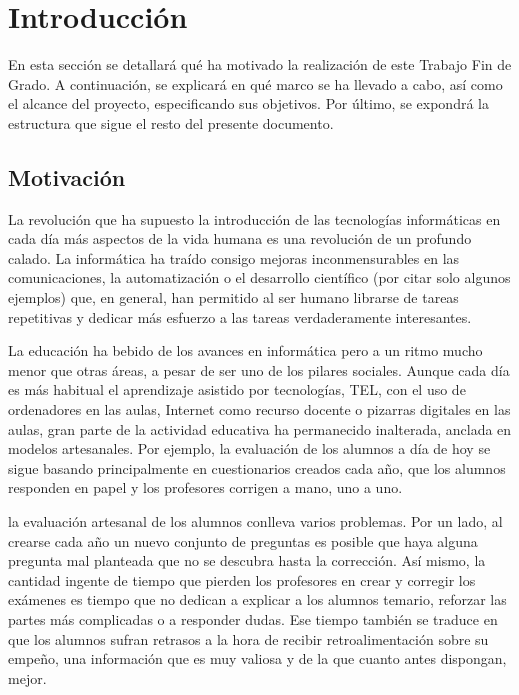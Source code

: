 \chapter{Introducción \label{sec:introduccion}}

En esta sección se detallará qué ha motivado la realización de este Trabajo Fin de Grado. A continuación, se explicará en qué marco se ha llevado a cabo, así como el alcance del proyecto, especificando sus objetivos. Por último, se expondrá  la estructura que sigue el resto del presente documento.

\section{Motivación}


La revolución que ha supuesto la introducción de las tecnologías informáticas en cada día más aspectos de la vida humana es una revolución de un profundo calado. La informática ha traído consigo mejoras inconmensurables en las comunicaciones, la automatización o el desarrollo científico (por citar solo algunos ejemplos) que, en general, han permitido al ser humano librarse de tareas repetitivas y dedicar más esfuerzo a las tareas verdaderamente interesantes.

La educación ha bebido de los avances en informática pero a un ritmo mucho menor que otras áreas, a pesar de ser uno de los pilares sociales. Aunque cada día es más habitual el aprendizaje asistido por tecnologías, \acrshort{TEL}, con el uso de ordenadores en las aulas, Internet como recurso docente o pizarras digitales en las aulas, gran parte de la actividad educativa ha permanecido inalterada, anclada en modelos artesanales. Por ejemplo, la evaluación de los alumnos a día de hoy se sigue basando principalmente en cuestionarios creados cada año, que los alumnos responden en papel y los profesores corrigen a mano, uno a uno.

la evaluación artesanal de los alumnos conlleva varios problemas. Por un lado, al crearse cada año un nuevo conjunto de preguntas es posible que haya alguna pregunta mal planteada que no se descubra hasta la corrección. Así mismo, la cantidad ingente de tiempo que pierden los profesores en crear y corregir los exámenes es tiempo que no dedican a explicar a los alumnos temario, reforzar las partes más complicadas o a responder dudas. Ese tiempo también se traduce en que los alumnos sufran retrasos a la hora de recibir retroalimentación sobre su empeño, una información que es muy valiosa y de la que cuanto antes dispongan, mejor.

